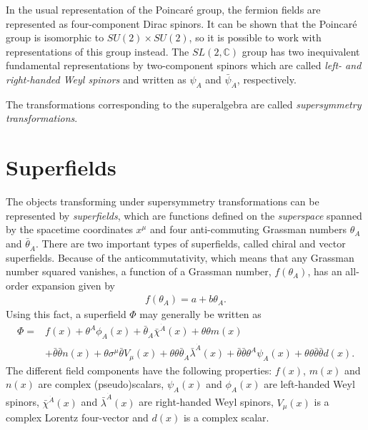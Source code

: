 \documentclass[twoside,english]{uiofysmaster}
\begin{document}
In the usual representation of the Poincar\'{e} group, the fermion fields are represented as four-component Dirac spinors. It can be shown that the Poincar\'{e} group is isomorphic to $SU(2)\times SU(2)$, so it is possible to work with representations of this group instead. The $SL(2,\mathbb{C})$ group has two inequivalent fundamental representations by two-component spinors which are called {\it left- and right-handed Weyl spinors} and written as $\psi_A$ and $\bar\psi_{\dot A}$, respectively. 

The transformations corresponding to the superalgebra are called {\it supersymmetry transformations}.

\section{Superfields}
The objects transforming under supersymmetry transformations can be represented by {\it superfields}, which are functions defined on the {\it superspace} spanned by the spacetime coordinates $x^\mu$ and four anti-commuting Grassman numbers $\theta_A$ and $\bar\theta_{\dot A}$.  There are two important types of superfields, called chiral and vector superfields. Because of the anticommutativity, which means that any Grassman number squared vanishes, a function of a Grassman number, $f(\theta_A)$, has an all-order expansion given by
\begin{align}
	f(\theta_A) = a + b\theta_A.
\end{align}
Using this fact, a superfield $\Phi$ may generally be written as
\begin{align}
	\Phi = &f(x) + \theta^A\phi_A(x) + \bar\theta_{\dot A}\bar\chi^{\dot A}(x) + \theta \theta m(x)\\
	 &+ \bar\theta \bar\theta n(x) + \theta\sigma^\mu \bar\theta V_\mu(x) + \theta\theta\bar\theta_{\dot A}\bar\lambda^{\dot A}(x) + \bar\theta \bar\theta \theta^A \psi_A(x) + \theta \theta \bar\theta \bar\theta d(x).\nonumber
\end{align}
The different field components have the following properties: $f(x)$, $m(x)$ and $n(x)$ are complex (pseudo)scalars, $\psi_A(x)$ and $\phi_A(x)$ are left-handed Weyl spinors, $\bar\chi^{\dot A}(x)$ and $\bar\lambda^{\dot A}(x)$ are right-handed Weyl spinors, $V_\mu (x)$ is a complex Lorentz four-vector and $d(x)$ is a complex scalar.
\end{document}
